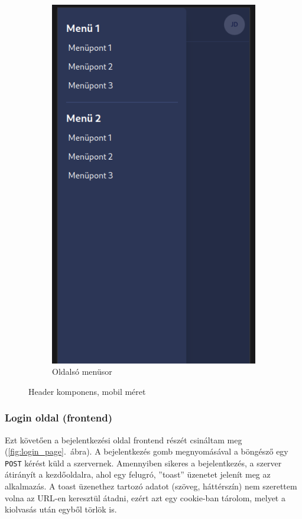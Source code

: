 \documentclass[a4paper]{article}
\newcommand{\inltxt}[1]{\texttt{#1}}
\begin{document}
\begin{figure}[ht]
\begin{subfigure}[b]{0.45\textwidth}
        \includegraphics[height=0.4\textheight]{images/header_mobile_open.png}
        \caption{Oldalsó menüsor}
        \label{fig:header_mobile_open}
    \end{subfigure}
    \caption{Header komponens, mobil méret}
    \label{fig:header_component_mobile}
\end{figure}

\subsubsection*{Login oldal (frontend)}
Ezt követően a bejelentkezési oldal frontend részét csináltam meg (\ref{fig:login_page}.~ábra).
A bejelentkezés gomb megnyomásával a böngésző egy \inltxt{POST} kérést küld a szervernek.
Amennyiben sikeres a bejelentkezés, a szerver átirányít a kezdőoldalra, ahol egy
felugró, ”toast” üzenetet jelenít meg az alkalmazás. A toast üzenethez tartozó adatot (szöveg, háttérszín) nem szerettem volna az
URL-en keresztül átadni, ezért azt egy cookie-ban tárolom, melyet a kiolvasás után egyből törlök is.
\end{document}
